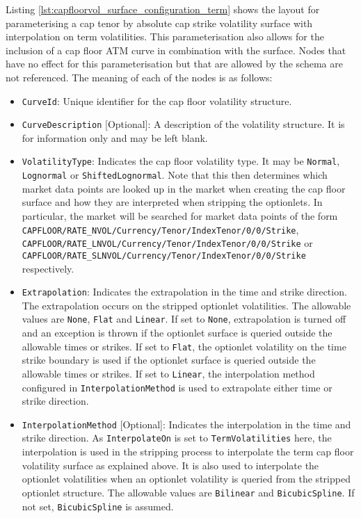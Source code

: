 Listing \ref{lst:capfloorvol_surface_configuration_term} shows the layout for parameterising a cap tenor by absolute cap strike volatility surface with interpolation on term volatilities. This parameterisation also allows for the inclusion of a cap floor ATM curve in combination with the surface. Nodes that have no effect for this parameterisation but that are allowed by the schema are not referenced. The meaning of each of the nodes is as follows:

\begin{itemize}
\item
\lstinline!CurveId!: Unique identifier for the cap floor volatility structure.

\item \lstinline!CurveDescription! [Optional]:
A description of the volatility structure. It is for information only and may be left blank.

\item \lstinline!VolatilityType!:
Indicates the cap floor volatility type. It may be \lstinline!Normal!, \lstinline!Lognormal! or \lstinline!ShiftedLognormal!. Note that this then determines which market data points are looked up in the market when creating the cap floor surface and how they are interpreted when stripping the optionlets. In particular, the market will be searched for market data points of the form \lstinline!CAPFLOOR/RATE_NVOL/Currency/Tenor/IndexTenor/0/0/Strike!, \lstinline!CAPFLOOR/RATE_LNVOL/Currency/Tenor/IndexTenor/0/0/Strike! or \lstinline!CAPFLOOR/RATE_SLNVOL/Currency/Tenor/IndexTenor/0/0/Strike! respectively.

\item \lstinline!Extrapolation!:
Indicates the extrapolation in the time and strike direction. The extrapolation occurs on the stripped optionlet volatilities. The allowable values are \lstinline!None!, \lstinline!Flat! and \lstinline!Linear!. If set to \lstinline!None!, extrapolation is turned off and an exception is thrown if the optionlet surface is queried outside the allowable times or strikes. If set to \lstinline!Flat!, the optionlet volatility on the time strike boundary is used if the optionlet surface is queried outside the allowable times or strikes. If set to \lstinline!Linear!, the interpolation method configured in \lstinline!InterpolationMethod! is used to extrapolate either time or strike direction.

\item \lstinline!InterpolationMethod! [Optional]:
Indicates the interpolation in the time and strike direction. As \lstinline!InterpolateOn! is set to \lstinline!TermVolatilities! here, the interpolation is used in the stripping process to interpolate the term cap floor volatility surface as explained above. It is also used to interpolate the optionlet volatilities when an optionlet volatility is queried from the stripped optionlet structure. The allowable values are \lstinline!Bilinear! and \lstinline!BicubicSpline!. If not set, \lstinline!BicubicSpline! is assumed.


\end{itemize}
